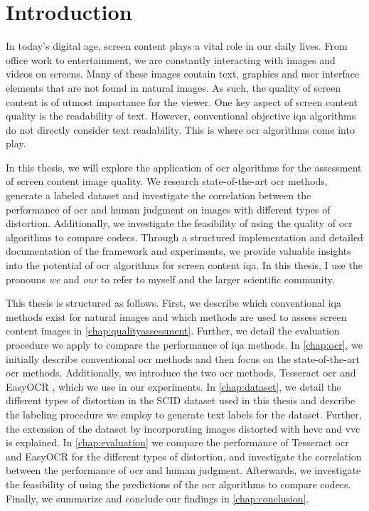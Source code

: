 \chapter{Introduction}
\label{chap:Introduction}


In today’s digital age, screen content plays a vital role in our daily lives.
From office work to entertainment, we are constantly interacting with images and videos on screens.
Many of these images contain text, graphics and user interface elements that are not found in natural images.
As such, the quality of screen content is of utmost importance for the viewer.
One key aspect of screen content quality is the readability of text.
However, conventional objective \gls{iqa} algorithms do not directly consider text readability.
This is where \gls{ocr} algorithms come into play.

In this thesis, we will explore the application of \gls{ocr} algorithms for the assessment of screen content image quality.
We research state-of-the-art \gls{ocr} methods, generate a labeled dataset and investigate the correlation between the performance of \gls{ocr} and human judgment on images with different types of distortion.
Additionally, we investigate the feasibility of using the quality of \gls{ocr} algorithms to compare codecs.
Through a structured implementation and detailed documentation of the framework and experiments, we provide valuable insights into the potential of \gls{ocr} algorithms for screen content \gls{iqa}.
In this thesis, I use the pronouns \textit{we} and \textit{our} to refer to myself and the larger scientific community.

This thesis is structured as follows.
First, we describe which conventional \gls{iqa} methods exist for natural images and which methods are used to assess screen content images in \autoref{chap:qualityassessment}.
Further, we detail the evaluation procedure we apply to compare the performance of \gls{iqa} methods.
In \autoref{chap:ocr}, we initially describe conventional \gls{ocr} methods and then focus on the state-of-the-art \gls{ocr} methods.
Additionally, we introduce the two \gls{ocr} methods, Tesseract \gls{ocr} \cite{tesseract_legacy_2007} and EasyOCR \cite{easyocr_gitub_2020}, which we use in our experiments.
In \autoref{chap:dataset}, we detail the different types of distortion in the SCID dataset \cite{ni_esim_2017} used in this thesis and describe the labeling procedure we employ to generate text labels for the dataset.
Further, the extension of the dataset by incorporating images distorted with \gls{hevc} \cite{hevc_2012} and \gls{vvc} \cite{vvc_2021} is explained.
In \autoref{chap:evaluation} we compare the performance of Tesseract \gls{ocr} and EasyOCR for the different types of distortion, and investigate the correlation between the performance of \gls{ocr} and human judgment.
Afterwards, we investigate the feasibility of using the predictions of the \gls{ocr} algorithms to compare codecs.
Finally, we summarize and conclude our findings in \autoref{chap:conclusion}.
